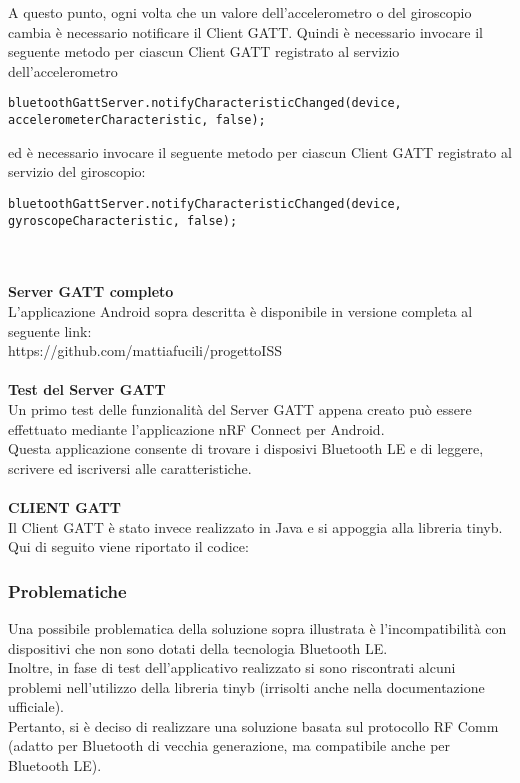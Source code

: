 \documentclass{article}
\begin{document}
A questo punto, ogni volta che un valore dell'accelerometro o del giroscopio cambia è necessario notificare il Client GATT. Quindi è necessario invocare il seguente metodo per ciascun Client GATT registrato al servizio dell'accelerometro
\begin{lstlisting}
bluetoothGattServer.notifyCharacteristicChanged(device, accelerometerCharacteristic, false);
\end{lstlisting}
ed è necessario invocare il seguente metodo per ciascun Client GATT registrato al servizio del giroscopio:
\begin{lstlisting}
bluetoothGattServer.notifyCharacteristicChanged(device, gyroscopeCharacteristic, false);
\end{lstlisting}
\\ \\ \textbf{Server GATT completo}\\
L'applicazione Android sopra descritta è disponibile in versione completa al seguente link:\\
https://github.com/mattiafucili/progettoISS
\\ \\ \textbf{Test del Server GATT}\\
Un primo test delle funzionalità del Server GATT appena creato può essere effettuato mediante l'applicazione nRF Connect per Android. \\
Questa applicazione consente di trovare i disposivi Bluetooth LE e di leggere, scrivere ed iscriversi alle caratteristiche.
\\ \\ \textbf{CLIENT GATT}\\
Il Client GATT è stato invece realizzato in Java e si appoggia alla libreria tinyb.\\
Qui di seguito viene riportato il codice:

\subsubsection{Problematiche}
Una possibile problematica della soluzione sopra illustrata è l'incompatibilità con dispositivi che non sono dotati della tecnologia Bluetooth LE. \\
Inoltre, in fase di test dell'applicativo realizzato si sono riscontrati alcuni problemi nell'utilizzo della libreria tinyb (irrisolti anche nella documentazione ufficiale).\\
Pertanto, si è deciso di realizzare una soluzione basata sul protocollo RF Comm (adatto per Bluetooth di vecchia generazione, ma compatibile anche per Bluetooth LE).
\end{document}
